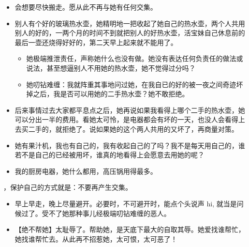 \documentclass[9pt, b5paper]{article}
\begin{document}
\begin{itemize}
\item 会想要尽快搬走。愿从此不再与她有任何交集。
\item 别人有个好的玻璃热水壶，她精明地一把收起了她自己的热水壶，两个人共用别人的好的，一两个月的时间不到就把别人的好热水壶，活宝妹自己休息前的最后一壶还烧得好好的，第二天早上起来就不能用了。
\begin{itemize}
\item 她极端推泄责任，声称她什么也没有做。她没有表达任何负责任的做法或说法，甚至想逼别人不用她的热水壶，她不觉得过分吗？
\item 她叨钻难缠：我就阵重其事地问过她，在我自已的好的被一夜之间奇迹坏掉之后，我是否可以用她的二手热水壶？她不敢拒绝。
\end{itemize}
\item 后来事情过去大家都平息点之后，她再说如果我看得上哪个二手的热水壶，她可以分出一半的费用。看她太可怜，是电器都会有坏的一天，也没人会看得上去买二手的，就拒绝了。说如果她的这个两人共用的又坏了，再商量对策。
\item 她有果汁机，我也有自己的，我有收起自己的了吗？我不是每天用自己的，谁若不是自己的已经被用坏，谁真的地看得上会愿意去用她的呢？
\item 我的厨房电器，她什么都用，高压锅用得最多。
\end{itemize}
，保护自己的方式就是：不要再产生交集。
\begin{itemize}
\item 早上早走，晚上尽量避开。必要时，不可避开时，能点个头说声 hi, 就当是问候过了。受不了她那种事儿经极端叨钻难缠的恶人。
\item 【绝不帮她】太耻辱了。帮助她，是天底下最大的自取其辱。她爱找谁帮忙，她找谁帮忙去。从此再不招惹她，太可恨，太可恶了！
\end{itemize}
\end{document}
